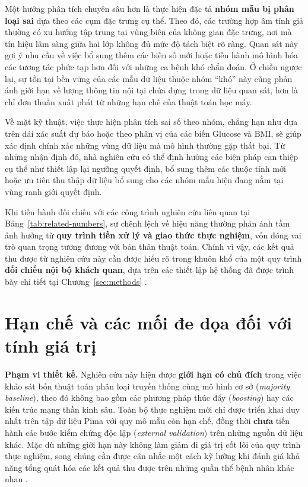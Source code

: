 \documentclass[14pt,a4paper]{extreport}
\begin{document}
Một hướng phân tích chuyên sâu hơn là thực hiện đặc tả \textbf{nhóm mẫu bị phân loại sai} dựa theo các cụm đặc trưng cụ thể. Theo đó, các trường hợp âm tính giả thường có xu hướng tập trung tại vùng biên của không gian đặc trưng, nơi mà tín hiệu lâm sàng giữa hai lớp không đủ mức độ tách biệt rõ ràng. Quan sát này gợi ý nhu cầu về việc bổ sung thêm các biến số mới hoặc tiến hành mô hình hóa các tương tác phức tạp hơn đối với những ca bệnh khó chẩn đoán. Ở chiều ngược lại, sự tồn tại bền vững của các mẫu dữ liệu thuộc nhóm ``khó'' này cũng phản ánh giới hạn về lượng thông tin nội tại chứa đựng trong dữ liệu quan sát, hơn là chỉ đơn thuần xuất phát từ những hạn chế của thuật toán học máy.

Về mặt kỹ thuật, việc thực hiện phân tích sai số theo nhóm, chẳng hạn như dựa trên dải xác suất dự báo hoặc theo phân vị của các biến Glucose và BMI, sẽ giúp xác định chính xác những vùng dữ liệu mà mô hình thường gặp thất bại. Từ những nhận định đó, nhà nghiên cứu có thể định hướng các biện pháp can thiệp cụ thể như thiết lập lại ngưỡng quyết định, bổ sung thêm các thuộc tính mới hoặc ưu tiên thu thập dữ liệu bổ sung cho các nhóm mẫu hiện đang nằm tại vùng ranh giới quyết định.

Khi tiến hành đối chiếu với các công trình nghiên cứu liên quan tại Bảng~\ref{tab:related-numbers}, sự chênh lệch về hiệu năng thường phản ánh tầm ảnh hưởng từ \textbf{quy trình tiền xử lý và giao thức thực nghiệm}, vốn đóng vai trò quan trọng tương đương với bản thân thuật toán. Chính vì vậy, các kết quả thu được từ nghiên cứu này cần được hiểu rõ trong khuôn khổ của một quy trình \textbf{đối chiếu nội bộ khách quan}, dựa trên các thiết lập hệ thống đã được trình bày chi tiết tại Chương~\ref{sec:methods} \cite{zhang2025pima,kirbas2025shap,smith1988}.

\section{Hạn chế và các mối đe dọa đối với tính giá trị}
\label{subsec:disc-limitations}

\textbf{Phạm vi thiết kế.} Nghiên cứu này hiện được \textbf{giới hạn có chủ đích} trong việc khảo sát bốn thuật toán phân loại truyền thống cùng mô hình cơ sở (\textit{majority baseline}), theo đó không bao gồm các phương pháp thúc đẩy (\textit{boosting}) hay các kiến trúc mạng thần kinh sâu. Toàn bộ thực nghiệm mới chỉ được triển khai duy nhất trên tập dữ liệu Pima với quy mô mẫu còn hạn chế, đồng thời \textbf{chưa} tiến hành các bước kiểm chứng độc lập (\textit{external validation}) trên những nguồn dữ liệu khác. Mặc dù những giới hạn này không làm giảm đi giá trị cốt lõi của quy trình thực nghiệm, song chúng cần được cân nhắc một cách kỹ lưỡng khi đánh giá khả năng tổng quát hóa các kết quả thu được trên những quần thể bệnh nhân khác nhau \cite{pedregosa2011}.
\end{document}
